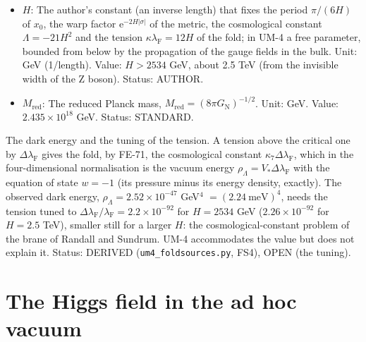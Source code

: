 \documentclass[
  10pt,
]{article}
\begin{document}
\begin{itemize}
  \(V_*\): The physical volume of the extra times \(x_5, x_6, x_7\) on
  the fold in the late universe,
  \(V_* = V_{\mathrm{t}}(\mathrm{e}^{-a_4}b_4)^3\) (with
  \(V_{\mathrm{t}} = \int\mathrm{d}x_5\,\mathrm{d}x_6\,\mathrm{d}x_7\)
  the coordinate volume of the extra times) at a time when
  \(\mathrm{e}^{-a_4}b_4\) is constant; it converts the
  eight-dimensional normalisation into the four-dimensional one. Unit:
  length\(^3\) (GeV\(^{-3}\)). Status: ASSUMED.
\item
  \(H\): The author's constant (an inverse length) that fixes the period
  \(\pi/(6H)\) of \(x_0\), the warp factor
  \(\mathrm{e}^{-2H\lvert\sigma\rvert}\) of the metric, the cosmological
  constant \(\Lambda = -21H^2\) and the tension
  \(\kappa\lambda_{\mathrm{F}} = 12H\) of the fold; in UM-4 a free
  parameter, bounded from below by the propagation of the gauge fields
  in the bulk. Unit: GeV (1/length). Value: \(H > 2534\) GeV, about 2.5
  TeV (from the invisible width of the Z boson). Status: AUTHOR.
\item
  \(M_{\mathrm{red}}\): The reduced Planck mass,
  \(M_{\mathrm{red}} = (8\pi G_{\mathrm{N}})^{-1/2}\). Unit: GeV. Value:
  \(2.435\times10^{18}\) GeV. Status: STANDARD.
\end{itemize}

The dark energy and the tuning of the tension. A tension above the
critical one by \(\Delta\lambda_{\mathrm{F}}\) gives the fold, by FE-71,
the cosmological constant \(\kappa_7\Delta\lambda_{\mathrm{F}}\), which
in the four-dimensional normalisation is the vacuum energy
\(\rho_\Lambda = V_*\Delta\lambda_{\mathrm{F}}\) with the equation of
state \(w = -1\) (its pressure minus its energy density, exactly). The
observed dark energy, \(\rho_\Lambda = 2.52\times10^{-47}\) GeV\(^4\)
\(= (2.24\ \text{meV})^4\), needs the tension tuned to
\(\Delta\lambda_{\mathrm{F}}/\lambda_{\mathrm{F}} = 2.2\times10^{-92}\)
for \(H = 2534\) GeV (\(2.26\times10^{-92}\) for \(H = 2.5\) TeV),
smaller still for a larger \(H\): the cosmological-constant problem of
the brane of Randall and Sundrum. UM-4 accommodates the value but does
not explain it. Status: DERIVED (\texttt{um4\_foldsources.py}, FS4),
OPEN (the tuning).

\hypertarget{the-higgs-field-in-the-ad-hoc-vacuum}{%
\section{The Higgs field in the ad hoc
vacuum}\label{the-higgs-field-in-the-ad-hoc-vacuum}}
\end{document}

